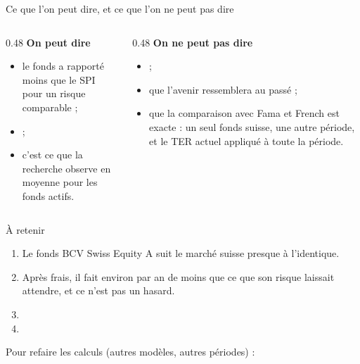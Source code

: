 \documentclass[aspectratio=169,11pt]{beamer}
\begin{document}
\begin{frame}{Ce que l'on peut dire, et ce que l'on ne peut pas dire}
  \begin{columns}[T]
    \begin{column}{0.48\textwidth}
      \textbf{\color{vert}On peut dire}
      \begin{itemize}
        \item le fonds a rapporté moins que le SPI pour un risque comparable ;
        \item \PeutFrais ;
        \item c'est ce que la recherche observe en moyenne pour les fonds actifs.
      \end{itemize}
    \end{column}
    \begin{column}{0.48\textwidth}
      \textbf{\color{orange}On ne peut pas dire}
      \begin{itemize}
        \item \NePeutPas ;
        \item que l'avenir ressemblera au passé ;
        \item que la comparaison avec Fama et French est exacte : un seul fonds suisse, une autre période, et le TER actuel appliqué à toute la période.
      \end{itemize}
    \end{column}
  \end{columns}
\end{frame}

\begin{frame}{À retenir}
  \begin{enumerate}
    \item Le fonds BCV Swiss Equity A suit le marché suisse presque à l'identique.
    \item Après frais, il fait environ \AlphaNet{} par an de moins que ce que son risque laissait attendre, et ce n'est pas un hasard.
    \item \RetenirTrois
    \item \RetenirQuatre
  \end{enumerate}
  \vfill
  {\small Pour refaire les calculs (autres modèles, autres périodes) : \URLSite}
\end{frame}
\end{document}
